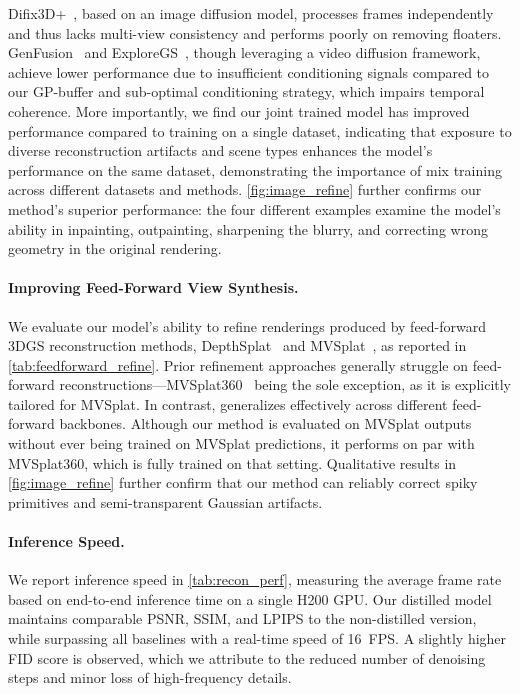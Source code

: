 Difix3D+~\cite{wu2025difix3d}, based on an image diffusion model, processes frames independently and thus lacks multi-view consistency and performs poorly on removing floaters. GenFusion~\cite{Wu2025GenFusion} and ExploreGS~\cite{Kim_2025_ExploreGS}, though leveraging a video diffusion framework, achieve lower performance due to insufficient conditioning signals compared to our GP-buffer and sub-optimal conditioning strategy, which impairs temporal coherence. More importantly, we find our joint trained model has improved performance compared to training on a single dataset, indicating that exposure to diverse reconstruction artifacts and scene types enhances the model’s performance on the same dataset, demonstrating the importance of mix training across different datasets and methods.
\cref{fig:image_refine} further confirms our method's superior performance: the four different examples examine the model's ability in inpainting, outpainting, sharpening the blurry, and correcting wrong geometry in the original rendering.

\paragraph{Improving Feed-Forward View Synthesis.}
We evaluate our model’s ability to refine renderings produced by feed-forward 3DGS reconstruction methods, DepthSplat~\cite{xu2024depthsplat} and MVSplat~\cite{chen2024mvsplat}, as reported in \cref{tab:feedforward_refine}. Prior refinement approaches generally struggle on feed-forward reconstructions—MVSplat360~\cite{chen2024mvsplat360} being the sole exception, as it is explicitly tailored for MVSplat. In contrast, \ours generalizes effectively across different feed-forward backbones.
Although our method is evaluated on MVSplat outputs without ever being trained on MVSplat predictions, it performs on par with MVSplat360, which is fully trained on that setting. Qualitative results in \cref{fig:image_refine} further confirm that our method can reliably correct spiky primitives and semi-transparent Gaussian artifacts.


\vspace{-10pt}

\paragraph{Inference Speed.}
We report inference speed in \cref{tab:recon_perf}, measuring the average frame rate based on end-to-end inference time on a single H200 GPU. Our distilled model maintains comparable PSNR, SSIM, and LPIPS to the non-distilled version, while surpassing all baselines with a real-time speed of 16~FPS. A slightly higher FID score is observed, which we attribute to the reduced number of denoising steps and minor loss of high-frequency details.


